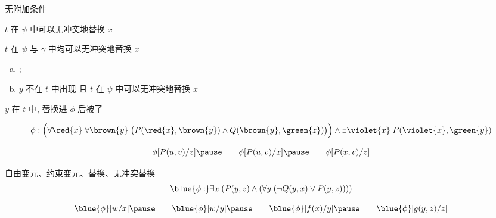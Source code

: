 \begin{frame}{}
  \begin{definition}
    \pause
    \begin{description}
      \setlength{\itemsep}{10pt}
      \item[$\phi$ 是原子公式:] 无附加条件
      \item[$\phi = \lnot\psi$:]
        $t$ 在 $\psi$ 中可以无冲突地替换 $x$
      \item[$\phi = \psi \ast \gamma$:]
        $t$ 在 $\psi$ 与 $\gamma$ 中均可以无冲突地替换 $x$
      \pause
      \item[$\phi = \forall/\exists y\; \psi$:]
        \begin{enumerate}[(a)]
          \item {}; 
          \item $y$ 不在 $t$ 中出现 且 $t$ 在 $\psi$ 中可以无冲突地替换 $x$
        \end{enumerate}
    \end{description}
  \end{definition}

  \pause
  \begin{center}
     $y$ 在 $t$ 中, 替换进 $\phi$ 后被了
  \end{center}

  \pause
  \[
    \phi: \Big(\forall \red{x}\; \forall \brown{y}\; \big(P(\red{x}, \brown{y})
      \land Q(\brown{y}, \green{z})\big)\Big) \land
      \exists \violet{x}\; P(\violet{x}, \green{y})
  \]

  \pause
  \[
    \phi[P(u, v)/z] \pause\qquad
    \phi[P(u, v)/x] \pause\qquad
    \phi[P(x, v)/z]
  \]
\end{frame}

\begin{frame}{}
  \begin{exampleblock}{自由变元、约束变元、替换、无冲突替换}
    \[
      \blue{\phi:} \exists x\; (P(y, z) \land
        (\forall y\; (\lnot Q(y, x) \lor P(y, z))))
    \]

    \pause
    \[
      \blue{\phi}[w/x] \pause\qquad
      \blue{\phi}[w/y] \pause\qquad
      \blue{\phi}[f(x)/y] \pause\qquad
      \blue{\phi}[g(y, z)/z]
    \]
  \end{exampleblock}
\end{frame}
